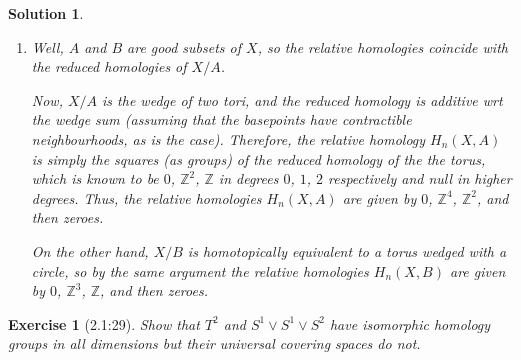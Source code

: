 \documentclass{article}
\theoremstyle{plain}
\newtheorem*{ex}{Exercise}
\theoremstyle{nonumberplain}
\newtheorem{sol}{Solution}
\newcommand{\Z}{\mathbb{Z}}
\begin{document}
\begin{sol}
\begin{enumerate}
Now, in the case $X = S^2$ we have $H_1(X) = 0$ (because $\pi_1(X) = 0$) and hence $H_1(X,A) \cong \Z^{n-1}$ in this case. On the other hand, if $X = T^2$ we have $H_1(X) \cong \Z^2$ and the computation of $H_1(X,A)$ becomes less obvious.

The exact sequence now becomes
\begin{equation}
0 \to \Z^2 \to H_1(X,A) \to \Z^{n-1} \to 0.
\end{equation}

Okay well, to compute $H_1(X,A)$ I'll use the following trick. Since $(X,A)$ is a good pair (any finite subset of a topological manifold is good, kind of trivially) the relative homology coincides with the reduced homology of $X/A$. Now, in a nice enough space (as is the case here), identifying two points is homotopically equivalent to wedging a copy of $S^1$ to the space, and arguing inductively we see that $X/A$ is equivalent to the torus wedged with $n-1$ copies of $S^1$. Now, the reduced homology $\tilde H_1(X/A)$ is additive under wedges (assuming the basepoint is nicely included in the spaces being wedged, which is the case here) so we see that $\tilde H_1(X/A) \cong \Z^2 \oplus \Z^{n-1}$, the first term coming from the torus and the second from the $n-1$ circles. This concludes the computation of $H_*(X,A)$.

\item Well, $A$ and $B$ are good subsets of $X$, so the relative homologies coincide with the reduced homologies of $X/A$.

Now, $X/A$ is the wedge of two tori, and the reduced homology is additive wrt the wedge sum (assuming that the basepoints have contractible neighbourhoods, as is the case). Therefore, the relative homology $H_n(X,A)$ is simply the squares (as groups) of the reduced homology of the the torus, which is known to be $0$, $\Z^2$, $\Z$ in degrees $0$, $1$, $2$ respectively and null in higher degrees. Thus, the relative homologies $H_n(X,A)$ are given by $0$, $\Z^4$, $\Z^2$, and then zeroes.

On the other hand, $X/B$ is homotopically equivalent to a torus wedged with a circle, so by the same argument the relative homologies $H_n(X,B)$ are given by $0$, $\Z^3$, $\Z$, and then zeroes.
\end{enumerate}
\end{sol}

\begin{ex}[2.1:29]
Show that $T^2$ and $S^1 \vee S^1 \vee S^2$ have isomorphic homology groups in all dimensions but their universal covering spaces do not.
\end{ex}
\end{document}
